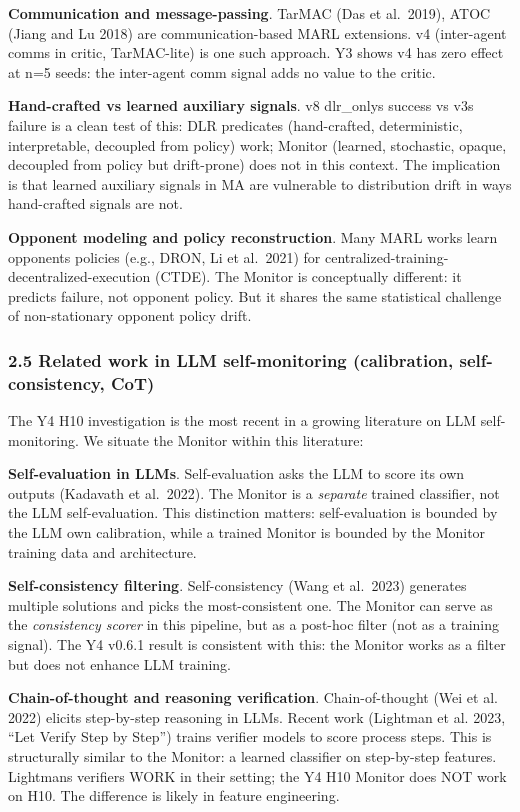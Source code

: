 \documentclass[11pt]{article}
\begin{document}
\textbf{Communication and message-passing}. TarMAC (Das et al.~2019),
ATOC (Jiang and Lu 2018) are communication-based MARL extensions. v4
(inter-agent comms in critic, TarMAC-lite) is one such approach. Y3
shows v4 has zero effect at n=5 seeds: the inter-agent comm signal adds
no value to the critic.

\textbf{Hand-crafted vs learned auxiliary signals}. v8 dlr\_onlys
success vs v3s failure is a clean test of this: DLR predicates
(hand-crafted, deterministic, interpretable, decoupled from policy)
work; Monitor (learned, stochastic, opaque, decoupled from policy but
drift-prone) does not in this context. The implication is that learned
auxiliary signals in MA are vulnerable to distribution drift in ways
hand-crafted signals are not.

\textbf{Opponent modeling and policy reconstruction}. Many MARL works
learn opponents policies (e.g., DRON, Li et al.~2021) for
centralized-training- decentralized-execution (CTDE). The Monitor is
conceptually different: it predicts failure, not opponent policy. But it
shares the same statistical challenge of non-stationary opponent policy
drift.

\subsubsection{2.5 Related work in LLM self-monitoring (calibration,
self-consistency,
CoT)}\label{related-work-in-llm-self-monitoring-calibration-self-consistency-cot}

The Y4 H10 investigation is the most recent in a growing literature on
LLM self-monitoring. We situate the Monitor within this literature:

\textbf{Self-evaluation in LLMs}. Self-evaluation asks the LLM to score
its own outputs (Kadavath et al.~2022). The Monitor is a \emph{separate}
trained classifier, not the LLM self-evaluation. This distinction
matters: self-evaluation is bounded by the LLM own calibration, while a
trained Monitor is bounded by the Monitor training data and
architecture.

\textbf{Self-consistency filtering}. Self-consistency (Wang et al.~2023)
generates multiple solutions and picks the most-consistent one. The
Monitor can serve as the \emph{consistency scorer} in this pipeline, but
as a post-hoc filter (not as a training signal). The Y4 v0.6.1 result is
consistent with this: the Monitor works as a filter but does not enhance
LLM training.

\textbf{Chain-of-thought and reasoning verification}. Chain-of-thought
(Wei et al. 2022) elicits step-by-step reasoning in LLMs. Recent work
(Lightman et al. 2023, ``Let Verify Step by Step'') trains verifier
models to score process steps. This is structurally similar to the
Monitor: a learned classifier on step-by-step features. Lightmans
verifiers WORK in their setting; the Y4 H10 Monitor does NOT work on
H10. The difference is likely in feature engineering.
\end{document}
